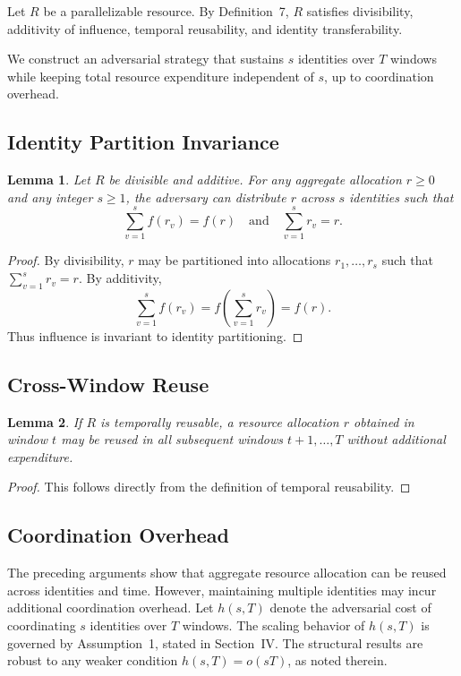 \documentclass[journal]{IEEEtran}
\newtheorem{lemma}{Lemma}
\begin{document}
	Let $R$ be a parallelizable resource.
	By Definition~7, $R$ satisfies divisibility,
	additivity of influence, temporal reusability,
	and identity transferability.
	
	We construct an adversarial strategy that sustains
	$s$ identities over $T$ windows while keeping total
	resource expenditure independent of $s$,
	up to coordination overhead.
	
	\subsection{Identity Partition Invariance}
	
	\begin{lemma}
		Let $R$ be divisible and additive.
		For any aggregate allocation $r \ge 0$
		and any integer $s \ge 1$,
		the adversary can distribute $r$
		across $s$ identities such that
		\[
		\sum_{v=1}^{s} f(r_v) = f(r)
		\quad \text{and} \quad
		\sum_{v=1}^{s} r_v = r.
		\]
	\end{lemma}
	
	\begin{proof}
		By divisibility, $r$ may be partitioned into allocations
		$r_1,\dots,r_s$ such that $\sum_{v=1}^{s} r_v = r$.
		By additivity,
		\[
		\sum_{v=1}^{s} f(r_v)
		=
		f\!\left(\sum_{v=1}^{s} r_v\right)
		=
		f(r).
		\]
		Thus influence is invariant to identity partitioning.
	\end{proof}
	
	\subsection{Cross-Window Reuse}
	
	\begin{lemma}
		If $R$ is temporally reusable,
		a resource allocation $r$ obtained in window $t$
		may be reused in all subsequent windows
		$t+1,\dots,T$ without additional expenditure.
	\end{lemma}
	
	\begin{proof}
		This follows directly from the definition
		of temporal reusability.
	\end{proof}
	
	
	\subsection{Coordination Overhead}
	The preceding arguments show that aggregate resource
	allocation can be reused across identities and time.
	However, maintaining multiple identities may incur
	additional coordination overhead. Let $h(s,T)$ denote
	the adversarial cost of coordinating $s$ identities
	over $T$ windows. The scaling behavior of $h(s,T)$
	is governed by Assumption~1, stated in Section~IV.
	The structural results are robust to any weaker
	condition $h(s,T) = o(sT)$, as noted therein.
	
\end{document}
